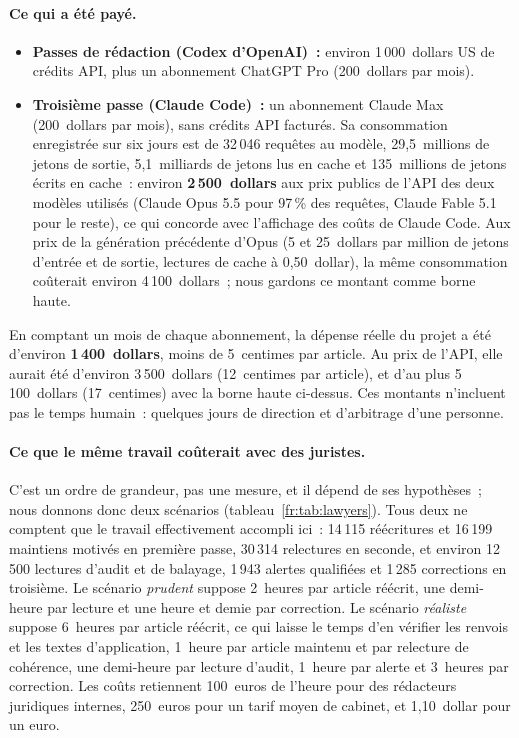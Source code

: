 \documentclass[11pt,a4paper]{article}
\begin{document}
\paragraph{Ce qui a été payé.}
\begin{itemize}
  \item \textbf{Passes de rédaction (Codex d'OpenAI)~:} environ 1\,000~dollars US de crédits API, plus un abonnement ChatGPT Pro (200~dollars par mois).
  \item \textbf{Troisième passe (Claude Code)~:} un abonnement Claude Max (200~dollars par mois), sans crédits API facturés. Sa consommation enregistrée sur six jours est de 32\,046 requêtes au modèle, 29,5~millions de jetons de sortie, 5,1~milliards de jetons lus en cache et 135~millions de jetons écrits en cache~: environ \textbf{2\,500~dollars} aux prix publics de l'API des deux modèles utilisés (Claude Opus 5.5 pour 97\,\% des requêtes, Claude Fable 5.1 pour le reste), ce qui concorde avec l'affichage des coûts de Claude Code. Aux prix de la génération précédente d'Opus (5 et 25~dollars par million de jetons d'entrée et de sortie, lectures de cache à 0,50~dollar), la même consommation coûterait environ 4\,100~dollars~; nous gardons ce montant comme borne haute.
\end{itemize}
En comptant un mois de chaque abonnement, la dépense réelle du projet a été d'environ \textbf{1\,400~dollars}, moins de 5~centimes par article. Au prix de l'API, elle aurait été d'environ 3\,500~dollars (12~centimes par article), et d'au plus 5\,100~dollars (17~centimes) avec la borne haute ci-dessus. Ces montants n'incluent pas le temps humain~: quelques jours de direction et d'arbitrage d'une personne.

\paragraph{Ce que le même travail coûterait avec des juristes.}
C'est un ordre de grandeur, pas une mesure, et il dépend de ses hypothèses~; nous donnons donc deux scénarios (tableau~\ref{fr:tab:lawyers}). Tous deux ne comptent que le travail effectivement accompli ici~: 14\,115 réécritures et 16\,199 maintiens motivés en première passe, 30\,314 relectures en seconde, et environ 12\,500 lectures d'audit et de balayage, 1\,943 alertes qualifiées et 1\,285 corrections en troisième. Le scénario \emph{prudent} suppose 2~heures par article réécrit, une demi-heure par lecture et une heure et demie par correction. Le scénario \emph{réaliste} suppose 6~heures par article réécrit, ce qui laisse le temps d'en vérifier les renvois et les textes d'application, 1~heure par article maintenu et par relecture de cohérence, une demi-heure par lecture d'audit, 1~heure par alerte et 3~heures par correction. Les coûts retiennent 100~euros de l'heure pour des rédacteurs juridiques internes, 250~euros pour un tarif moyen de cabinet, et 1,10~dollar pour un euro.
\end{document}
